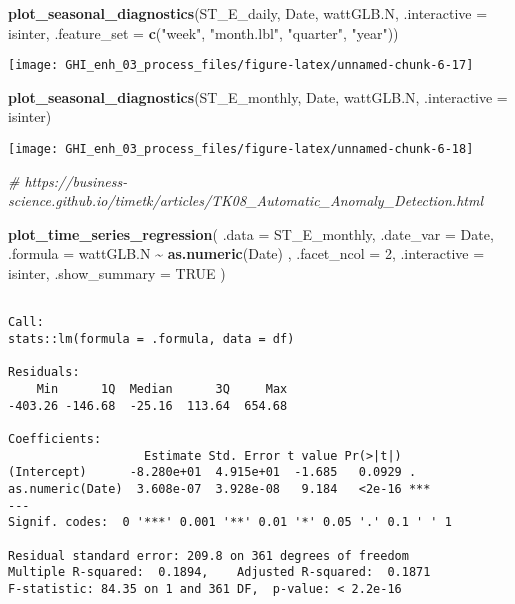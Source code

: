 \documentclass[
  10pt,
  a4paper,oneside]{article}
\newenvironment{Shaded}{\begin{snugshade}}{\end{snugshade}}
\newcommand{\AttributeTok}[1]{\textcolor[rgb]{0.13,0.29,0.53}{#1}}
\newcommand{\CommentTok}[1]{\textcolor[rgb]{0.56,0.35,0.01}{\textit{#1}}}
\newcommand{\ConstantTok}[1]{\textcolor[rgb]{0.56,0.35,0.01}{#1}}
\newcommand{\DecValTok}[1]{\textcolor[rgb]{0.00,0.00,0.81}{#1}}
\newcommand{\FunctionTok}[1]{\textcolor[rgb]{0.13,0.29,0.53}{\textbf{#1}}}
\newcommand{\NormalTok}[1]{#1}
\newcommand{\SpecialCharTok}[1]{\textcolor[rgb]{0.81,0.36,0.00}{\textbf{#1}}}
\newcommand{\StringTok}[1]{\textcolor[rgb]{0.31,0.60,0.02}{#1}}
\begin{document}
\begin{Shaded}
\begin{Highlighting}[]
\FunctionTok{plot\_seasonal\_diagnostics}\NormalTok{(ST\_E\_daily, Date, wattGLB.N, }\AttributeTok{.interactive =}\NormalTok{ isinter,}
                          \AttributeTok{.feature\_set =} \FunctionTok{c}\NormalTok{(}\StringTok{"week"}\NormalTok{, }\StringTok{"month.lbl"}\NormalTok{, }\StringTok{"quarter"}\NormalTok{, }\StringTok{"year"}\NormalTok{))}
\end{Highlighting}
\end{Shaded}

\begin{center}\texttt{[image: GHI\_enh\_03\_process\_files/figure-latex/unnamed-chunk-6-17]} \end{center}

\begin{Shaded}
\begin{Highlighting}[]
\FunctionTok{plot\_seasonal\_diagnostics}\NormalTok{(ST\_E\_monthly, Date, wattGLB.N, }\AttributeTok{.interactive =}\NormalTok{ isinter)}
\end{Highlighting}
\end{Shaded}

\begin{center}\texttt{[image: GHI\_enh\_03\_process\_files/figure-latex/unnamed-chunk-6-18]} \end{center}

\begin{Shaded}
\begin{Highlighting}[]
\CommentTok{\# https://business{-}science.github.io/timetk/articles/TK08\_Automatic\_Anomaly\_Detection.html}

\FunctionTok{plot\_time\_series\_regression}\NormalTok{(}
    \AttributeTok{.data         =}\NormalTok{ ST\_E\_monthly,}
    \AttributeTok{.date\_var     =}\NormalTok{ Date,}
    \AttributeTok{.formula      =}\NormalTok{ wattGLB.N }\SpecialCharTok{\textasciitilde{}} \FunctionTok{as.numeric}\NormalTok{(Date)  ,}
    \AttributeTok{.facet\_ncol   =} \DecValTok{2}\NormalTok{,}
    \AttributeTok{.interactive  =}\NormalTok{ isinter,}
    \AttributeTok{.show\_summary =} \ConstantTok{TRUE}
\NormalTok{)}
\end{Highlighting}
\end{Shaded}

\begin{verbatim}

Call:
stats::lm(formula = .formula, data = df)

Residuals:
    Min      1Q  Median      3Q     Max 
-403.26 -146.68  -25.16  113.64  654.68 

Coefficients:
                   Estimate Std. Error t value Pr(>|t|)    
(Intercept)      -8.280e+01  4.915e+01  -1.685   0.0929 .  
as.numeric(Date)  3.608e-07  3.928e-08   9.184   <2e-16 ***
---
Signif. codes:  0 '***' 0.001 '**' 0.01 '*' 0.05 '.' 0.1 ' ' 1

Residual standard error: 209.8 on 361 degrees of freedom
Multiple R-squared:  0.1894,    Adjusted R-squared:  0.1871 
F-statistic: 84.35 on 1 and 361 DF,  p-value: < 2.2e-16
\end{verbatim}
\end{document}
